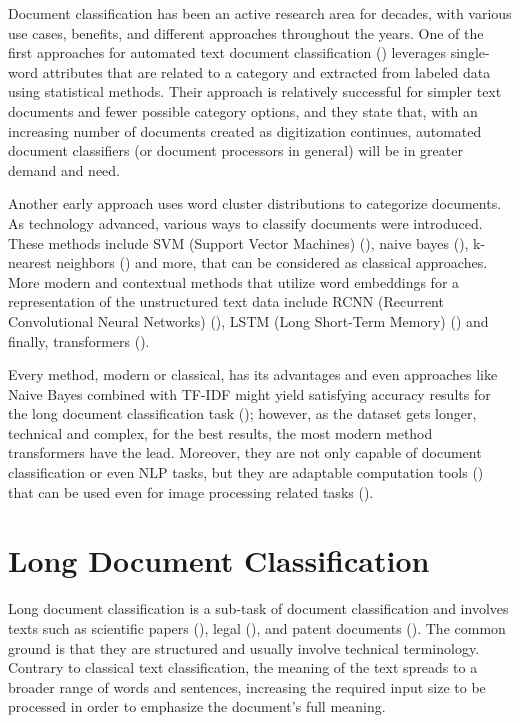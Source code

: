 \documentclass{iyte}
\begin{document}
Document classification has been an active research area for decades, with various use cases, benefits, and different approaches throughout the years. One of the first approaches for automated text document classification (\citealt{historical_doc_class}) leverages single-word attributes that are related to a category and extracted from labeled data using statistical methods. Their approach is relatively successful for simpler text documents and fewer possible category options, and they state that, with an increasing number of documents created as digitization continues, automated document classifiers (or document processors in general) will be in greater demand and need.

Another early approach \cite{historical_dist_clustering} uses word cluster distributions to categorize documents. As technology advanced, various ways to classify documents were introduced. These methods include SVM (Support Vector Machines) (\citealt{classical_svm}), naive bayes (\citealt{classical_naive_bayes}), k-nearest neighbors (\citealt{classical_k_nearest}) and more, that can be considered as classical approaches. More modern and contextual methods that utilize word embeddings for a representation of the unstructured text data include RCNN (Recurrent Convolutional Neural Networks) (\citealt{modern_rcnn}), LSTM (Long Short-Term Memory) (\citealt{modern_lstm}) and finally, transformers (\citealt{attention_is_all_you_need}).

Every method, modern or classical, has its advantages and even approaches like Naive Bayes combined with TF-IDF might yield satisfying accuracy results for the long document classification task (\citealt{comperative_long_doc_survey}); however, as the dataset gets longer, technical and complex, for the best results, the most modern method transformers have the lead. Moreover, they are not only capable of document classification or even NLP tasks, but they are adaptable computation tools (\citealt{transformers_as_universal_engines}) that can be used even for image processing related tasks (\citealt{vision_transformers}).

\section{Long Document Classification}

Long document classification is a sub-task of document classification and involves texts such as scientific papers (\citealt{specter}), legal (\citealt{legalDB}), and patent documents (\citealt{patent_classification_book_survey}). The common ground is that they are structured and usually involve technical terminology. Contrary to classical text classification, the meaning of the text spreads to a broader range of words and sentences, increasing the required input size to be processed in order to emphasize the document's full meaning.
\end{document}
